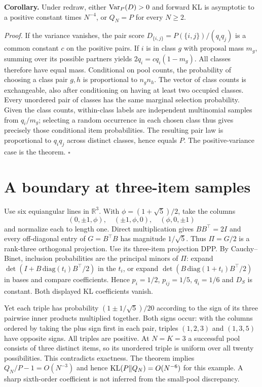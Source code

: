 \documentclass[11pt]{article}
\begin{document}
\textbf{Corollary.} Under redraw, either $\operatorname{Var}_P(D)>0$ and forward KL is asymptotic to a positive constant times $N^{-4}$, or $Q_N=P$ for every $N\ge2$.

\textit{Proof.} If the variance vanishes, the pair score $D_{\{i,j\}}=P(\{i,j\})/(q_iq_j)$ is a common constant $c$ on the positive pairs. If $i$ is in class $g$ with proposal mass $m_g$, summing over its possible partners yields $2q_i=cq_i(1-m_g)$. All classes therefore have equal mass. Conditional on pool counts, the probability of choosing a class pair $g,h$ is proportional to $n_g n_h$. The vector of class counts is exchangeable, also after conditioning on having at least two occupied classes. Every unordered pair of classes has the same marginal selection probability. Given the class counts, within-class labels are independent multinomial samples from $q_i/m_g$; selecting a random occurrence in each chosen class thus gives precisely those conditional item probabilities. The resulting pair law is proportional to $q_iq_j$ across distinct classes, hence equals $P$. The positive-variance case is the theorem. \hfill$\square$

\section{A boundary at three-item samples}
Use six equiangular lines in $\mathbb R^3$. With $\phi=(1+\sqrt5)/2$, take the columns
\[
 (0,\pm1,\phi),\quad (\pm1,\phi,0),\quad(\phi,0,\pm1)
\]
and normalize each to length one. Direct multiplication gives $BB^\top=2I$ and every off-diagonal entry of $G=B^\top B$ has magnitude $1/\sqrt5$. Thus $\Pi=G/2$ is a rank-three orthogonal projection. Use its three-item projection DPP. By Cauchy--Binet, inclusion probabilities are the principal minors of $\Pi$: expand $\det(I+B\,\mathrm{diag}(t_i)B^\top/2)$ in the $t_i$, or expand $\det(B\,\mathrm{diag}(1+t_i)B^\top/2)$ in bases and compare coefficients. Hence $p_i=1/2$, $p_{ij}=1/5$, $q_i=1/6$ and $D_S$ is constant. Both displayed KL coefficients vanish.

Yet each triple has probability $(1\pm1/\sqrt5)/20$ according to the sign of its three pairwise inner products multiplied together. Both signs occur: with the columns ordered by taking the plus sign first in each pair, triples $(1,2,3)$ and $(1,3,5)$ have opposite signs. All triples are positive. At $N=K=3$ a successful pool consists of three distinct items, so its unordered triple is uniform over all twenty possibilities. This contradicts exactness. The theorem implies $Q_N/P-1=O(N^{-3})$ and hence $\operatorname{KL}(P\|Q_N)=O(N^{-6})$ for this example. A sharp sixth-order coefficient is not inferred from the small-pool discrepancy.
\end{document}

